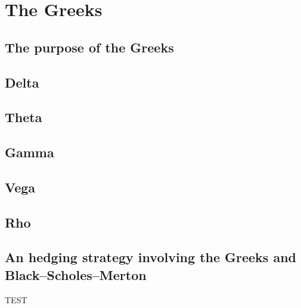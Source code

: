 \documentclass[12pt]{report}
\newcommand{\BSM}{Black--Scholes--Merton }
\begin{document}
%
%
\chapter{The Greeks}
\label{cha:The Greeks}


\section{The purpose of the Greeks}
\label{sec:The purpose of the Greeks}


\section{Delta}
\label{sec:Delta}


\section{Theta}
\label{sec:Theta}


\section{Gamma}
\label{sec:Gamma}


\section{Vega}
\label{sec:Vega}


\section{Rho}
\label{sec:Rho}


\section{An hedging strategy involving the Greeks and \BSM}
\label{sec:An hedging strategy involving the Greeks and \BSM}

TEST
\end{document}
